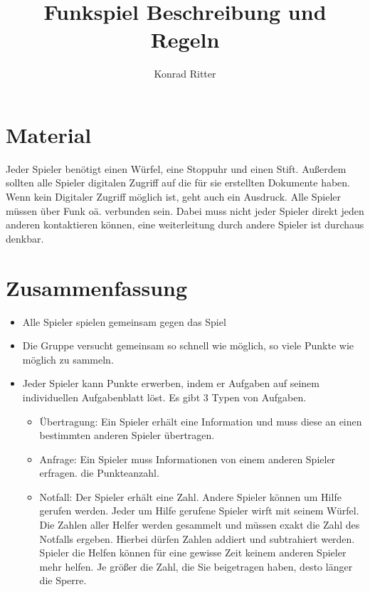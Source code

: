 \documentclass[12pt,a4paper]{scrreport}
\author{Konrad Ritter}
\title{Funkspiel Beschreibung und Regeln}
\begin{document}
\maketitle
\section{Material}
Jeder Spieler benötigt einen Würfel, eine Stoppuhr und einen Stift.
Außerdem sollten alle Spieler digitalen Zugriff auf die für sie erstellten
Dokumente haben. Wenn kein Digitaler Zugriff möglich ist, geht auch ein
Ausdruck. Alle Spieler müssen über Funk oä. verbunden sein. Dabei muss nicht
jeder Spieler direkt jeden anderen kontaktieren können, eine weiterleitung durch
andere Spieler ist durchaus denkbar.

\section{Zusammenfassung}
\begin{itemize}
	\item Alle Spieler spielen gemeinsam gegen das Spiel
	\item Die Gruppe versucht gemeinsam so schnell wie möglich, so viele Punkte
		wie möglich zu sammeln.
	\item Jeder Spieler kann Punkte erwerben, indem er Aufgaben auf seinem
		individuellen Aufgabenblatt löst. Es gibt 3 Typen von Aufgaben.
		\begin{itemize}
			\item Übertragung: Ein Spieler erhält eine Information und muss
				diese an einen bestimmten anderen Spieler übertragen.
			\item Anfrage: Ein Spieler muss Informationen von einem anderen
				Spieler erfragen. 
				die Punkteanzahl.
			\item Notfall: Der Spieler erhält eine Zahl. Andere Spieler können
				um Hilfe gerufen werden. Jeder um Hilfe gerufene Spieler wirft
				mit seinem Würfel. Die Zahlen aller Helfer werden gesammelt und
				müssen exakt die Zahl des Notfalls ergeben. Hierbei dürfen
				Zahlen addiert und subtrahiert werden. Spieler die Helfen können
				für eine gewisse Zeit keinem anderen Spieler mehr helfen. Je
				größer die Zahl, die Sie beigetragen haben, desto länger die
				Sperre.
		\end{itemize}
\end{itemize}
\end{document}
